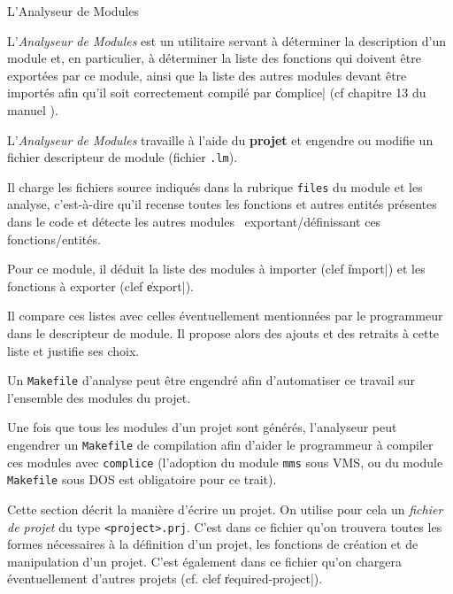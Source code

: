  {L'Analyseur de Modules}

L'{\em Analyseur de Modules} est un utilitaire servant \`{a} d\'{e}terminer la
description d'un module et, en particulier, \`{a} d\'{e}terminer la liste
des fonctions qui doivent \^{e}tre export\'{e}es par ce module, ainsi
que la liste des autres modules devant \^{e}tre import\'{e}s afin qu'il soit
correctement compil\'{e} par \|complice| (cf chapitre 13
du manuel \LeLisp ).


L'{\em Analyseur de Modules} travaille \`{a} l'aide du {\bf projet} et
engendre ou modifie un fichier descripteur de module
(fichier {\tt .lm}).

Il charge les fichiers source indiqu\'{e}s dans la rubrique {\tt files}
du module et les analyse, c'est-\`{a}-dire qu'il recense toutes les fonctions et
autres entit\'{e}s pr\'{e}sentes dans le code et d\'{e}tecte les
autres modules \LeLisp\ exportant/d\'{e}finissant ces fonctions/entit\'{e}s.

Pour ce module, il d\'{e}duit la liste des modules \`{a} importer (clef
\|import|) et les fonctions \`{a} exporter (clef \|export|).

Il compare ces listes avec celles \'{e}ventuellement mentionn\'{e}es par le
programmeur dans 
le descripteur de module.  Il propose alors des ajouts et des retraits
\`{a} cette liste et justifie ses choix.

Un {\tt Makefile} d'analyse peut \^{e}tre engendr\'{e} afin d'automatiser ce
travail sur l'ensemble des modules du projet.

Une fois que tous les modules d'un projet sont g\'{e}n\'{e}r\'{e}s,
l'analyseur peut engendrer un {\tt Makefile} de compilation afin d'aider le
programmeur \`{a} compiler ces modules avec {\tt complice} (l'adoption du
module {\tt mms} sous VMS, ou du module {\tt Makefile} sous DOS est
obligatoire pour ce trait).


Cette section d\'{e}crit la mani\`{e}re d'\'{e}crire un projet. 
On utilise pour cela un {\it fichier de projet} du type {\tt <project>.prj}.
C'est dans ce fichier qu'on trouvera toutes les formes
n\'{e}cessaires \`{a} la d\'{e}finition d'un projet,
les fonctions de cr\'{e}ation et de manipulation
d'un projet. C'est \'{e}galement dans ce fichier qu'on chargera
\'{e}ventuellement d'autres projets (cf. clef \|required-project|).


